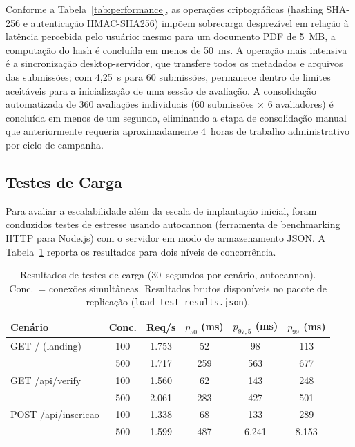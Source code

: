 \documentclass[preprint,12pt,a4paper]{elsarticle}
\begin{document}
Conforme a Tabela~\ref{tab:performance}, as operações criptográficas (hashing SHA-256 e autenticação HMAC-SHA256) impõem sobrecarga desprezível em relação à latência percebida pelo usuário: mesmo para um documento PDF de 5~MB, a computação do hash é concluída em menos de 50~ms. A operação mais intensiva é a sincronização desktop-servidor, que transfere todos os metadados e arquivos das submissões; com 4,25~s para 60 submissões, permanece dentro de limites aceitáveis para a inicialização de uma sessão de avaliação. A consolidação automatizada de 360 avaliações individuais (60 submissões $\times$ 6 avaliadores) é concluída em menos de um segundo, eliminando a etapa de consolidação manual que anteriormente requeria aproximadamente 4~horas de trabalho administrativo por ciclo de campanha.

\subsection{Testes de Carga}

Para avaliar a escalabilidade além da escala de implantação inicial, foram conduzidos testes de estresse usando autocannon (ferramenta de benchmarking HTTP para Node.js) com o servidor em modo de armazenamento JSON. A Tabela~\ref{tab:loadtest} reporta os resultados para dois níveis de concorrência.

\begin{table}[H]
\centering
\footnotesize
\begin{tabular}{|l|c|c|c|c|c|}
\hline
\textbf{Cenário} & \textbf{Conc.} & \textbf{Req/s} & \textbf{$p_{50}$ (ms)} & \textbf{$p_{97,5}$ (ms)} & \textbf{$p_{99}$ (ms)} \\
\hline
GET / (landing) & 100 & 1.753 & 52 & 98 & 113 \\
 & 500 & 1.717 & 259 & 563 & 677 \\
\hline
GET /api/verify & 100 & 1.560 & 62 & 143 & 248 \\
 & 500 & 2.061 & 283 & 427 & 501 \\
\hline
POST /api/inscricao & 100 & 1.338 & 68 & 133 & 289 \\
 & 500 & 1.599 & 487 & 6.241 & 8.153 \\
\hline
\end{tabular}
\caption{Resultados de testes de carga (30~segundos por cenário, autocannon). Conc.\ = conexões simultâneas. Resultados brutos disponíveis no pacote de replicação (\texttt{load\_test\_results.json}).}
\label{tab:loadtest}
\end{table}
\end{document}
